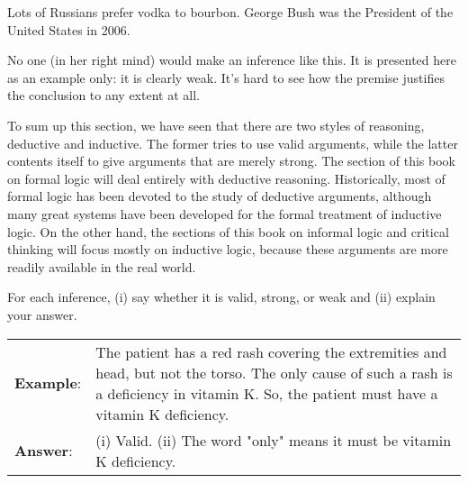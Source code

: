 \begin{earg*}
\item  Lots of Russians prefer vodka to bourbon.
\itemc  George Bush was the President of the United States in 2006.
\end{earg*}

No one (in her right mind) would make an inference like this. It is presented here as an example only: it is clearly weak. It's hard to see how the premise justifies the conclusion to any extent at all.

To sum up this section, we have seen that there are two styles of reasoning, deductive and inductive. The former tries to use valid arguments, while the latter contents itself to give arguments that are merely strong. The section of this book on formal logic will deal entirely with deductive reasoning. Historically, most of formal logic has been devoted to the study of deductive arguments, although many great systems have been developed for the formal treatment of inductive logic. On the other hand, the sections of this book on informal logic and critical thinking will focus mostly on inductive logic, because these arguments are more readily available in the real world.



\practiceproblems

\noindent\problempart For each inference, (i) say whether it is valid, strong, or weak and (ii) explain your answer.

\begin{longtabu}{p{.1\linewidth}p{.8\linewidth}}
\textbf{Example}: & The patient has a red rash covering the extremities and head, but not the torso. The only cause of such a rash is a deficiency in vitamin K. So, the patient must have a vitamin K deficiency. \\
\textbf{Answer}: & \noindent (i) Valid. \newline
\noindent (ii) The word "only" means it must be vitamin K deficiency.
\\
\end{longtabu}

